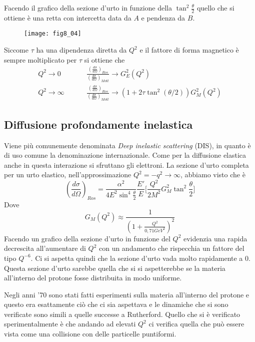 Facendo il grafico della sezione d'urto in funzione della $\tan^2\frac{\theta}{2}$ quello che si ottiene è una retta con intercetta data da $A$ e pendenza da $B$.
\begin{figure}[h]
\centering
\texttt{[image: fig8\_04]}
\end{figure}
 
Siccome $\tau$ ha una dipendenza diretta da $Q^2$ e il fattore di forma magnetico è sempre moltiplicato per $\tau$ si ottiene che 
\begin{equation}
\begin{split}
Q^2\to 0
\hspace{1cm}
& \frac{\left(\frac{d\sigma}{d\Omega}\right)_{Ros}}{\left(\frac{d\sigma}{d\Omega}\right)_{Mott}}\to G^2_E(Q^2)\\
Q^2\to \infty
\hspace{1cm}
& \frac{\left(\frac{d\sigma}{d\Omega}\right)_{Ros}}{\left(\frac{d\sigma}{d\Omega}\right)_{Mott}}\to (1+2\tau\tan^2(\theta/2))G^2_M(Q^2)
\end{split}
\end{equation} 

\subsection{Diffusione profondamente inelastica}
Viene più comunemente denominata \emph{Deep inelastic scattering} (DIS), in quanto è di uso comune la denominazione internazionale.
Come per la diffusione elastica anche in questa interazione si sfruttano gli elettroni.
La sezione d'urto completa per un urto elastico, nell'approssimazione $Q^2=-q^2\to \infty$, abbiamo visto che è
\begin{equation}
\left(\frac{d\sigma}{d\Omega}\right)_{Ros}=\frac{\alpha^2}{4E^2\sin^4\frac{\theta}{2}}\frac{E'}{E}\biggl[\frac{Q^2}{2M^2}G_M^2\tan^2\frac{\theta}{2}\biggl]
\end{equation}
Dove 
\[
G_M(Q^2)\approx \frac{1}{\left(1+\frac{Q^2}{0,71GeV^2}\right)^2}
\]
Facendo un grafico della sezione d'urto in funzione del $Q^2$ evidenzia una rapida decrescita all'aumentare di $Q^2$ con un andamento che rispecchia un fattore del tipo $Q^{-6}$.
Ci si aspetta quindi che la sezione d'urto vada molto rapidamente a $0$.
Questa sezione d'urto sarebbe quella che si si aspetterebbe se la materia all'interno del protone fosse distribuita in modo uniforme.

Negli anni '70 sono stati fatti esperimenti sulla materia all'interno del protone e questo era esattamente ciò che ci sia aspettava e le dinamiche che si sono verificate sono simili a quelle successe a Rutherford.
Quello che si è verificato sperimentalmente è che andando ad elevati $Q^2$ ci verifica quella che può essere vista come una collisione con delle particelle puntiformi.


